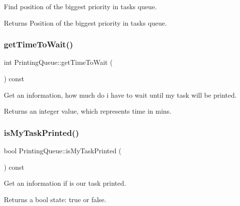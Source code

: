 Find position of the biggest priority in tasks queue. 

\begin{DoxyReturn}{Returns}
Position of the biggest priority in tasks queue. 
\end{DoxyReturn}
\mbox{\label{class_printing_queue_ad677a39d56b5ee403e88f4e32da606e4}} 
\subsubsection{\texorpdfstring{get\+Time\+To\+Wait()}{getTimeToWait()}}
{\footnotesize\ttfamily int Printing\+Queue\+::get\+Time\+To\+Wait (\begin{DoxyParamCaption}{ }\end{DoxyParamCaption}) const}



Get an information, how much do i have to wait until my task will be printed. 

\begin{DoxyReturn}{Returns}
an integer value, which represents time in mins. 
\end{DoxyReturn}
\mbox{\label{class_printing_queue_aa0081c56e8ff9fc7acbc8eb0c552f61c}} 
\subsubsection{\texorpdfstring{is\+My\+Task\+Printed()}{isMyTaskPrinted()}}
{\footnotesize\ttfamily bool Printing\+Queue\+::is\+My\+Task\+Printed (\begin{DoxyParamCaption}{ }\end{DoxyParamCaption}) const}



Get an information if is our task printed. 

\begin{DoxyReturn}{Returns}
a bool state\+: true or false. 
\end{DoxyReturn}
\mbox{\label{class_printing_queue_a6e0a48416ddf06b841e1bae87ded0ab6}} 
